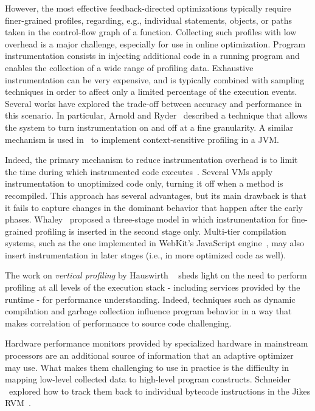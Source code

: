However, the most effective feedback-directed optimizations typically require finer-grained profiles, regarding, e.g., individual statements, objects, or paths taken in the control-flow graph of a function. Collecting such profiles with low overhead is a major challenge, especially for use in online optimization. Program instrumentation consists in injecting additional code in a running program and enables the collection of a wide range of profiling data. Exhaustive instrumentation can be very expensive, and is typically combined with sampling techniques in order to affect only a limited percentage of the execution events. Several works have explored the trade-off between accuracy and performance in this scenario. In particular, Arnold and Ryder~\cite{Arnold01} described a technique that allows the system to turn instrumentation on and off at a fine granularity. A similar mechanism is used in~\cite{Zhuang06} to implement context-sensitive profiling in a JVM.

Indeed, the primary mechanism to reduce instrumentation overhead is to limit the time during which instrumented code executes~\cite{Arnold05}. Several VMs apply instrumentation to unoptimized code only, turning it off when a method is recompiled. This approach has several advantages, but its main drawback is that it fails to capture changes in the dominant behavior that happen after the early phases. Whaley~\cite{Whaley01} proposed a three-stage model in which instrumentation for fine-grained profiling is inserted in the second stage only. Multi-tier compilation systems, such as the one implemented in WebKit's JavaScript engine~\cite{Pizlo14}, may also insert instrumentation in later stages (i.e., in more optimized code as well).

The work on {\em vertical profiling} by Hauswirth \etal~\cite{Hauswirth04} sheds light on the need to perform profiling at all levels of the execution stack - including services provided by the runtime - for performance understanding. Indeed, techniques such as dynamic compilation and garbage collection influence program behavior in a way that makes correlation of performance to source code challenging.

Hardware performance monitors provided by specialized hardware in mainstream processors are an additional source of information that an adaptive optimizer may use. What makes them challenging to use in practice is the difficulty in mapping low-level collected data to high-level program constructs. Schneider \etal\ explored how to track them back to individual bytecode instructions in the Jikes RVM~\cite{Schneider07}.

